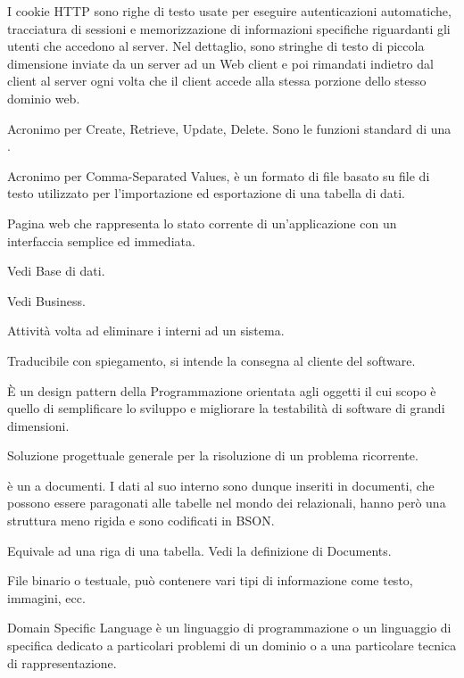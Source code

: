 I cookie HTTP sono righe di testo usate per eseguire autenticazioni automatiche, tracciatura di sessioni e memorizzazione di informazioni specifiche riguardanti gli utenti che accedono al server. Nel dettaglio, sono stringhe di testo di piccola dimensione inviate da un server ad un Web client e poi rimandati indietro dal client al server ogni volta che il client accede alla stessa porzione dello stesso dominio web.

Acronimo per Create, Retrieve, Update, Delete. Sono le funzioni standard di una .

Acronimo per Comma-Separated Values, è un formato di file basato su file di testo utilizzato per l'importazione ed esportazione di una tabella di dati.


Pagina web che rappresenta lo stato corrente di un'applicazione con un interfaccia semplice ed immediata.

Vedi Base di dati.

Vedi Business.

Attività volta ad eliminare i  interni ad un sistema. 

Traducibile con spiegamento, si intende la consegna al cliente del software.

\`E un design pattern della Programmazione orientata agli oggetti il cui scopo è quello di semplificare lo sviluppo e migliorare la testabilità di software di grandi dimensioni.

Soluzione progettuale generale per la risoluzione di un problema ricorrente.

 è un  a documenti. I dati al suo interno sono dunque inseriti in documenti, che possono essere paragonati alle tabelle nel mondo dei  relazionali, hanno però una struttura meno rigida e sono codificati in BSON.

Equivale ad una riga di una tabella. Vedi la definizione di Documents.

File binario o testuale, può contenere vari tipi di informazione come testo, immagini, ecc.

Domain Specific Language è un linguaggio di programmazione o un linguaggio di specifica dedicato a particolari problemi di un dominio o a una particolare tecnica di rappresentazione.

